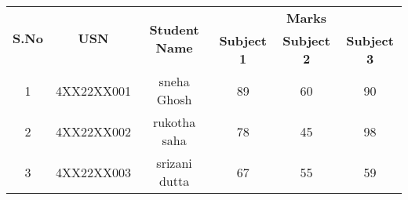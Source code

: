 \documentclass{article}
\begin{document}
\begin{table}[ht]
\centering
\begin{tabular}{|c|c|c|c|c|c|}
\hline
\multirow{2}{*}{\textbf{S.No}} & \multirow{2}{*}{\textbf{USN}} & \multirow{2}{*}{\textbf{Student Name}} & \multicolumn{3}{c|}{\textbf{Marks}} \\
\cline{4-6}
 &  &  & \textbf{Subject 1} & \textbf{Subject 2} & \textbf{Subject 3} \\
\hline
1 & 4XX22XX001 & sneha Ghosh   & 89 & 60 & 90 \\
2 & 4XX22XX002 & rukotha saha  & 78 & 45 & 98 \\
3 & 4XX22XX003 & srizani dutta & 67 & 55 & 59 \\
\hline
\end{tabular}
\end{table}
\end{document}
